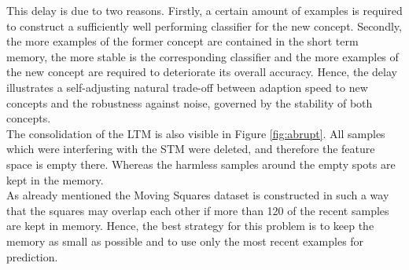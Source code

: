 \documentclass[conference]{IEEEtran}
\begin{document}
This delay is due to two reasons. Firstly, a certain amount of examples is required to construct a sufficiently well performing classifier for the new concept. Secondly,
the more examples of the former concept are contained in the short term memory, the more stable is the corresponding classifier and the more examples of the 
new concept are required to deteriorate its overall accuracy. Hence, the delay illustrates a self-adjusting natural trade-off between adaption speed
to new concepts and the robustness against noise, governed by the stability of both concepts.\\
The consolidation of the LTM is also visible in Figure \ref{fig:abrupt}. All samples which were interfering with the STM were deleted, and therefore the feature space is empty there. 
Whereas the harmless samples around the empty spots are kept in the memory.\\
As already mentioned the Moving Squares dataset is constructed in such a way that the squares may overlap each other if more than 120 of the recent samples are kept in memory. Hence,
the best strategy for this problem is to keep the memory as small as possible and to use only the most recent examples for prediction. 
\end{document}
